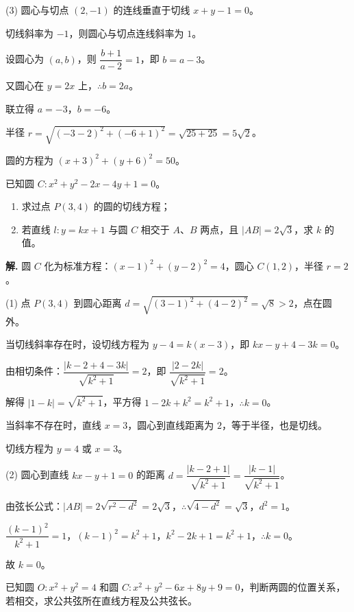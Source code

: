 \documentclass[11pt]{ctexrep}
\begin{document}
(3) 圆心与切点 $(2, -1)$ 的连线垂直于切线 $x + y - 1 = 0$。

切线斜率为 $-1$，则圆心与切点连线斜率为 $1$。

设圆心为 $(a, b)$，则 $\dfrac{b + 1}{a - 2} = 1$，即 $b = a - 3$。

又圆心在 $y = 2x$ 上，$\therefore b = 2a$。

联立得 $a = -3$，$b = -6$。

半径 $r = \sqrt{(-3 - 2)^2 + (-6 + 1)^2} = \sqrt{25 + 25} = 5\sqrt{2}$。

圆的方程为 $\boxed{(x + 3)^2 + (y + 6)^2 = 50}$。

\begin{example}[直线与圆的位置关系]
    已知圆 $C: x^2 + y^2 - 2x - 4y + 1 = 0$。
    \begin{enumerate}
        \item 求过点 $P(3, 4)$ 的圆的切线方程；
        \item 若直线 $l: y = kx + 1$ 与圆 $C$ 相交于 $A$、$B$ 两点，且 $|AB| = 2\sqrt{3}$，求 $k$ 的值。
    \end{enumerate}
\end{example}

\textbf{解.} 圆 $C$ 化为标准方程：$(x - 1)^2 + (y - 2)^2 = 4$，圆心 $C(1, 2)$，半径 $r = 2$。

(1) 点 $P(3, 4)$ 到圆心距离 $d = \sqrt{(3-1)^2 + (4-2)^2} = \sqrt{8} > 2$，点在圆外。

当切线斜率存在时，设切线方程为 $y - 4 = k(x - 3)$，即 $kx - y + 4 - 3k = 0$。

由相切条件：$\dfrac{|k - 2 + 4 - 3k|}{\sqrt{k^2 + 1}} = 2$，即 $\dfrac{|2 - 2k|}{\sqrt{k^2 + 1}} = 2$。

解得 $|1 - k| = \sqrt{k^2 + 1}$，平方得 $1 - 2k + k^2 = k^2 + 1$，$\therefore k = 0$。

当斜率不存在时，直线 $x = 3$，圆心到直线距离为 $2$，等于半径，也是切线。

切线方程为 $\boxed{y = 4}$ 或 $\boxed{x = 3}$。

(2) 圆心到直线 $kx - y + 1 = 0$ 的距离 $d = \dfrac{|k - 2 + 1|}{\sqrt{k^2 + 1}} = \dfrac{|k - 1|}{\sqrt{k^2 + 1}}$。

由弦长公式：$|AB| = 2\sqrt{r^2 - d^2} = 2\sqrt{3}$，$\therefore \sqrt{4 - d^2} = \sqrt{3}$，$d^2 = 1$。

$\dfrac{(k - 1)^2}{k^2 + 1} = 1$，$(k - 1)^2 = k^2 + 1$，$k^2 - 2k + 1 = k^2 + 1$，$\therefore k = 0$。

故 $k = \boxed{0}$。

\begin{realexam}[练习]
    已知圆 $O: x^2 + y^2 = 4$ 和圆 $C: x^2 + y^2 - 6x + 8y + 9 = 0$，判断两圆的位置关系，若相交，求公共弦所在直线方程及公共弦长。
\end{realexam}
\end{document}
